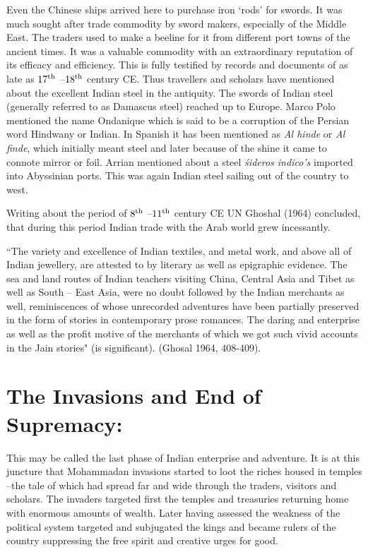 Even the Chinese ships arrived here to purchase iron `rods' for swords. It was much sought after trade commodity by sword makers, especially of the Middle East. The traders used to make a beeline for it from different port towns of the ancient times. It was a valuable commodity with an extraordinary reputation of its efficacy and efficiency. This is fully testified by records and documents of as late as $17^{\rm th}$ –$18^{\rm th}$ century CE. Thus travellers and scholars have mentioned about the excellent Indian steel in the antiquity. The swords of Indian steel (generally referred to as Damascus steel) reached up to Europe. Marco Polo mentioned the name Ondanique which is said to be a corruption of the Persian word Hindwany or Indian. In Spanish it has been mentioned as {\it Al hinde} or {\it Al finde}, which initially meant steel and later because of the shine it came to connote mirror or foil. Arrian mentioned about a steel {\it śideros indico's} imported into Abyssinian ports. This was again Indian steel sailing out of the country to west. 

Writing about the period of $8^{\rm th}$ –$11^{\rm th}$ century CE UN Ghoshal (1964) concluded, that during this period Indian trade with the Arab world grew incessantly.

 \footnotesize{``The variety and excellence of Indian textiles, and metal work, and above all of Indian jewellery, are attested to by literary as well as epigraphic evidence. The sea and land routes of Indian teachers visiting China, Central Asia and Tibet as well as South – East Asia, were no doubt followed by the Indian merchants as well, reminiscences of whose unrecorded adventures have been partially preserved in the form of stories in contemporary prose romances. The daring and enterprise as well as the profit motive of the merchants of which we got such vivid accounts in the Jain stories"} (is significant). (Ghosal 1964, 408-409).

\vspace{-.3cm}

\section*{The Invasions and End of Supremacy:}

\vspace{-.2cm}

This may be called the last phase of Indian enterprise and adventure. It is at this juncture that Mohammadan invasions started to loot the riches housed in temples –the tale of which had spread far and wide through the traders, visitors and scholars. The invaders targeted first the temples and treasuries returning home with enormous amounts of wealth. Later having assessed the weakness of the political system targeted and subjugated the kings and became rulers of the country suppressing the free spirit and creative urges for good.

